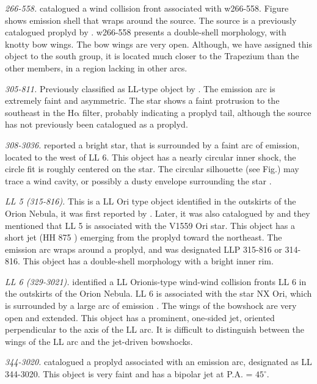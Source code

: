 \documentclass[apj, twocolumn]{aastex63}
\newcommand\ha{\ensuremath{\mathrm{H\alpha}}}
\begin{document}
\textit{266-558.} \citet{Bally:2000a} catalogued a wind collision
front associated with w266-558. Figure shows emission shell that
wraps around the source. The source is a previously catalogued
proplyd by \citet{Ricci:2008a}. w266-558 presents a double-shell
morphology, with knotty bow wings. The bow wings are very open.
Although, we have assigned this object to the south group, it is
located much closer to the Trapezium than the other members, in
a region lacking in other arcs.

\textit{305-811.} Previously classified as LL-type object
by \citet{Bally:2006a}. The emission arc is extremely faint
and asymmetric. The star shows  a faint protrusion to the
southeast in the \ha{} filter, probably indicating a proplyd
tail, although the source has not previously been catalogued as
a proplyd.    

\textit{308-3036.} \citet{Bally:2006a} reported a bright star,
that is surrounded by a faint arc of emission, located to the west
of LL 6. This object has a nearly circular inner shock, the circle
fit is roughly centered on the star. The circular silhouette
(see Fig.) may trace a wind cavity, or possibly a dusty envelope
surrounding the star \citep{Bally:2006a}.       

\textit{LL 5 (315-816).} This is a LL Ori type object identified in
the outskirts of the Orion Nebula, it was first reported by
\citet{Bally:2001a}. Later, it was also catalogued by
\citet{Bally:2006a} and they mentioned that LL 5 is associated
with the  V1559 Ori star. This object has a short jet (HH 875
\citealp{Bally:2006a}) emerging from the proplyd toward the northeast.
The emission arc wraps around a proplyd, and was designated LLP 315-816
or 314-816. This object has a double-shell morphology with a bright
inner rim.
       
\textit{LL 6 (329-3021).} \citep{Bally:2001a} identified a LL Orionis-type
wind-wind collision fronts LL 6 in the outskirts of the Orion Nebula. LL 6
is associated with the star NX Ori, which is surrounded by a large arc of
emission \citep{Bally:2006a}. The wings of the bowshock are very open and
extended. This object has a prominent, one-sided jet, oriented perpendicular
to the axis of the LL arc. It is difficult to distinguish between the wings
of the LL arc and the jet-driven bowshocks.    

\textit{344-3020.} \citet{Bally:2006a} catalogued a proplyd associated
with an emission arc, designated as LL 344-3020. This object is very faint
and has a bipolar jet at P.A. = $45^{\circ}$.     
\end{document}
